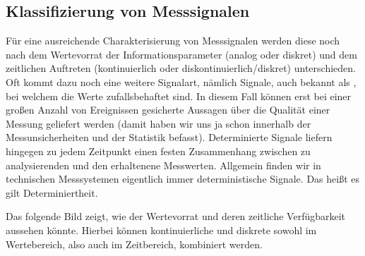 \documentclass[letterpaper,10pt,english]{jupyterBook}
\begin{document}
\subsection{Klassifizierung von Messsignalen }
\label{\detokenize{content/3_Modulationen:klassifizierung-von-messsignalen-a-id-subsec-klassifizierung-von-messsignalen-a}}
\sphinxAtStartPar
Für eine ausreichende Charakterisierung von Messsignalen werden diese noch nach dem Wertevorrat der Informationsparameter (analog oder diskret) und dem zeitlichen Auftreten (kontinuierlich oder diskontinuierlich/diskret) unterschieden. Oft kommt dazu noch eine weitere Signalart, nämlich  Signale, auch bekannt als , bei welchem die Werte zufallsbehaftet sind. In diesem Fall können erst bei einer großen Anzahl von Ereignissen gesicherte Aussagen über die Qualität einer Messung geliefert werden (damit haben wir uns ja schon innerhalb der Messunsicherheiten und der Statistik befasst).
Determinierte Signale liefern hingegen zu jedem Zeitpunkt einen festen Zusammenhang zwischen zu analysierenden und den erhaltenene Messwerten. Allgemein finden wir in technischen Messsystemen eigentlich immer deterministische Signale. Das heißt es gilt Determiniertheit.

\sphinxAtStartPar
Das folgende Bild zeigt, wie der Wertevorrat und deren zeitliche Verfügbarkeit aussehen könnte. Hierbei können kontinuierliche und diskrete sowohl im Wertebereich, also auch im Zeitbereich, kombiniert werden.

\sphinxAtStartPar
{}
\end{document}
